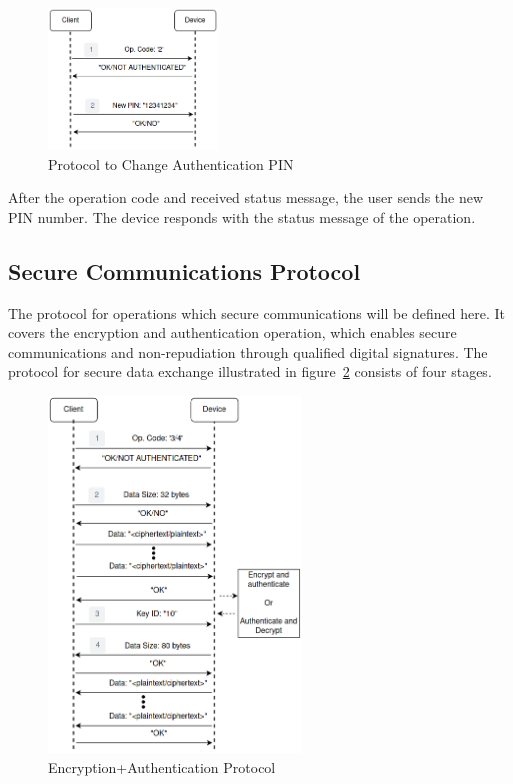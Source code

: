 \begin{figure}[h!]
	\centering
	\includegraphics[width=0.4\textwidth]{./Images/change-PIN.png}
	\caption{Protocol to Change Authentication PIN}
	\label{fig:protocol:change-PIN}
\end{figure}

After the operation code and received status message, the user sends the new \ac{PIN} number. The device responds with the status message of the operation.

\subsection{Secure Communications Protocol}\label{chap:implementation:protocol:comms}

The protocol for operations which secure communications will be defined here. It covers the encryption and authentication operation, which enables secure communications and non-repudiation through qualified digital signatures.
The protocol for secure data exchange illustrated in figure~\ref{fig:protocol:data-exchange} consists of four stages.

\begin{figure}[h!]
	\centering
	\includegraphics[width=0.6\textwidth]{./Images/data-exchange.png}
	\caption{Encryption+Authentication Protocol}
	\label{fig:protocol:data-exchange}
\end{figure}

